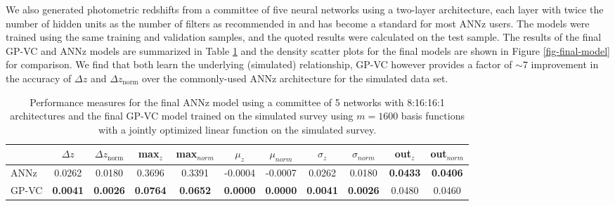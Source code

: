 \documentclass[useAMS,usenatbib,fleqn]{mn2e}
\begin{document}
We also generated photometric redshifts from a committee of five neural networks using a two-layer architecture, each layer with twice the number of hidden units as the number of filters as recommended in \cite{Collister04} and has become a standard for most {\sc ANNz} users. The models were trained using the same training and validation samples, and the quoted results were calculated on the test sample. The results of the final GP-VC and {\sc ANNz} models are summarized in Table \ref{table-GP-ANN-simulated} and the density scatter plots for the final models are shown in Figure \ref{fig-final-model} for comparison. We find that both learn the underlying (simulated) relationship, GP-VC however provides a factor of $\sim 7$ improvement in the accuracy of $\Delta z$ and $\Delta z_\textrm{norm}$ over the commonly-used {\sc ANNz} architecture for the simulated data set.

 \begin{table}
\caption{Performance measures for the final {\sc ANNz} model using a committee of 5 networks with 8:16:16:1 architectures and the final GP-VC model trained on the simulated survey using $m=1600$ basis functions with a jointly optimized linear function on the simulated survey.}
\begin{center}
\begin{tabular}{| l | c | c |  c | c |  c | c |  c | c |  c | c | }
     				&	$\Delta z$	&	$\Delta z_\textrm{norm}$	&	max$_{z}$ & max$_{norm}$		&	$\mu_{z}$&	$\mu_{norm}$	& $\sigma_{z}$ & $\sigma_{norm}$ & out$_{z}$&out$_{norm}$\\	\hline
	{\sc ANNz}		&	0.0262	&	0.0180		&	0.3696		&	0.3391&	-0.0004		&	-0.0007&	0.0262		&	0.0180&	\textbf{0.0433}		&	\textbf{0.0406}\\
	GP-VC		&	\textbf{0.0041} 	&	\textbf{0.0026}	&	\textbf{0.0764}		&	\textbf{0.0652}&	\textbf{0.0000}			&	\textbf{0.0000}&	\textbf{0.0041}		&	\textbf{0.0026}&	0.0480	&	0.0460\\\hline
  \end{tabular}
\end{center}
\label{table-GP-ANN-simulated}
\end{table}
\end{document}
